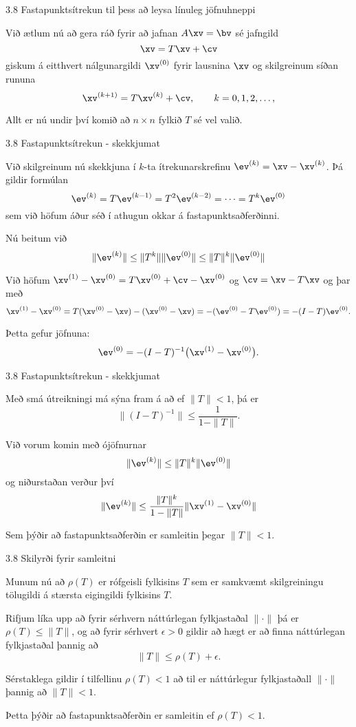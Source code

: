 \begin{frame}{3.8 Fastapunktsítrekun til þess að leysa línuleg jöfnuhneppi}  

Við ætlum nú að gera ráð fyrir að jafnan $A\xv=\bv$ sé jafngild
$$
\xv=T\xv+\cv
$$
giskum á eitthvert nálgunargildi $\xv^{(0)}$ fyrir lausnina $\xv$ og
skilgreinum síðan rununa 
$$
\xv^{(k+1)}=T\xv^{(k)}+\cv, \qquad k=0,1,2,\dots,
$$

\pause
\smallskip
Allt er nú undir því komið  að $n\times n$ fylkið $T$ sé vel valið.
\end{frame}

\begin{frame}{3.8 Fastapunktsítrekun - skekkjumat} 

Við skilgreinum nú skekkjuna í $k$-ta ítrekunarskrefinu
$\ev^{(k)}=\xv-\xv^{(k)}$.  Þá gildir formúlan
$$
\ev^{(k)}=T\ev^{(k-1)}=T^2\ev^{(k-2)}=\cdots=T^{k}\ev^{(0)}
$$
sem við höfum áður séð í athugun okkar á fastapunktsaðferðinni.

\pause
\smallskip
Nú beitum við 
$$
\|\ev^{(k)}\| \leq \|T^{k}\|\|\ev^{(0)}\|\leq \|T\|^{k}\|\ev^{(0)}\|
$$

\pause
\smallskip
Við höfum $\xv^{(1)}-\xv^{(0)}=T\xv^{(0)}+\cv-\xv^{(0)}$ og 
$\cv=\xv-T\xv$ og þar með
$$
\xv^{(1)}-\xv^{(0)}=T(\xv^{(0)}-\xv)-(\xv^{(0)}-\xv)=
-(\ev^{(0)}-T\ev^{(0)})=-(I-T)\ev^{(0)}.
$$

\pause
\smallskip
Þetta gefur jöfnuna:
$$
\ev^{(0)}=-(I-T)^{-1} \big(\xv^{(1)}-\xv^{(0)}\big).
$$

\end{frame}

\begin{frame}{3.8 Fastapunktsítrekun - skekkjumat} 

Með smá útreikningi má sýna fram á að ef $\|T\|<1$, þá er
$$
\|(I-T)^{-1}\|\leq \dfrac 1{1-\|T\|}.
$$

\pause
\smallskip
Við vorum komin með ójöfnurnar
$$
\|\ev^{(k)}\| \leq \|T\|^{k}\|\ev^{(0)}\|
$$
og niðurstaðan verður því 
$$
\|\ev^{(k)}\| \leq \dfrac{\|T\|^{k}}{1-\|T\|} 
\|\xv^{(1)}-\xv^{(0)}\|
$$

\pause
\smallskip

Sem þýðir að fastapunktsaðferðin er samleitin þegar $\|T\|<1$.

\end{frame}

\begin{frame}{3.8 Skilyrði fyrir samleitni} 

Munum nú að $\rho(T)$ er rófgeisli fylkisins $T$ sem er samkvæmt
skilgreiningu tölugildi á stærsta eigingildi fylkisins $T$.  


\pause
\smallskip
Rifjum líka upp að fyrir sérhvern náttúrlegan fylkjastaðal $\|\cdot\|$
þá er $\rho(T) \leq \|T\|$,  og að fyrir sérhvert
$\epsilon>0$ gildir að hægt er að finna náttúrlegan fylkjastaðal þannig að
$$
\|T\|\leq \rho(T)+\epsilon.
$$

\pause
\smallskip
Sérstaklega gildir í tilfellinu $\rho(T)<1$ að til er náttúrlegur
fylkjastaðall $\|\cdot\|$ þannig að $\|T\|<1$. 
\pause 

Þetta þýðir að fastapunktsaðferðin er samleitin ef $\rho(T) < 1$.
\end{frame}

